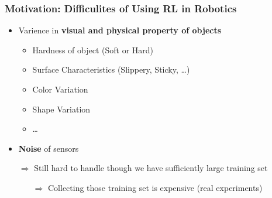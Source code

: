 \documentclass{beamer}
\newcommand{\firstSec}{Motivation}
\begin{document}
    \begin{frame}
      \frametitle{\firstSec : Difficulites of Using RL in Robotics}
      \begin{itemize}
        \item Varience in \textbf{visual and physical property of objects}
        \pause
        \begin{itemize}
          \item Hardness of object (Soft or Hard)
          \item Surface Characteristics (Slippery, Sticky, \ldots)
          \item Color Variation
          \item Shape Variation
          \item \ldots
        \end{itemize}
        \pause
        \item \textbf{Noise} of sensors
      \end{itemize}
      \pause
      \begin{itemize}
        \setlength{\itemindent}{.3in}
        \item[$\Rightarrow$] Still hard to handle though we have sufficiently large training set
        \begin{itemize}
          \setlength{\itemindent}{0.3in}
          \item[$\Rightarrow$] Collecting those training set is expensive (real experiments) 
        \end{itemize}
      \end{itemize}
    \end{frame}
\end{document}
